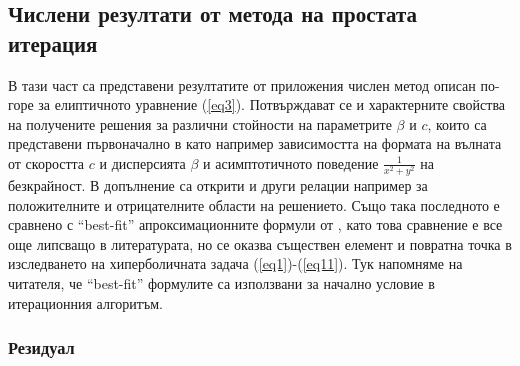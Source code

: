 \documentclass{article}
\newcommand{\rf}[1]{(\ref{#1})}
\theoremstyle{remark}
\begin{document}
\subsection{Числени резултати от метода на простата итерация}\label{resultsHyperbolic}
В тази част са представени резултатите от приложения числен метод описан по-горе за елиптичното уравнение \rf{eq3}. Потвърждават се и характерните свойства на получените решения за различни стойности на параметрите $\beta$ и $c$, които са представени първоначално в \cite{ref116,Ch2011} като например зависимостта на формата на вълната от скоростта $c$ и дисперсията $\beta$ и асимптотичното поведение $\frac{1}{x^2 + y^2}$ на безкрайност. В допълнение са открити и други релации например за положителните и отрицателните области на решението.
Също така последното е сравнено с ``best-fit'' апроксимационните формули от \cite{Ch2011}, като това сравнение е все още липсващо в литературата, но се оказва съществен елемент и повратна точка в изследването на хиперболичната задача \rf{eq1}-\rf{eq11}. Тук напомняме на читателя, че ``best-fit'' формулите са използвани за начално условие в итерационния алгоритъм.

\subsubsection{Резидуал}
\end{document}
